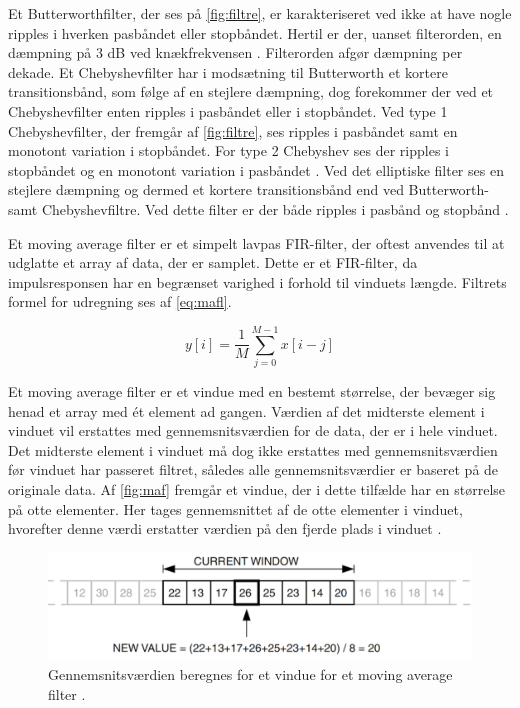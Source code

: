 \noindent
Et Butterworthfilter, der ses på \autoref{fig:filtre}, er karakteriseret ved ikke at have nogle ripples i hverken pasbåndet eller stopbåndet. 
Hertil er der, uanset filterorden, en dæmpning på 3 dB ved knækfrekvensen \citep{nilsson2015}. Filterorden afgør dæmpning per dekade.
Et Chebyshevfilter har i modsætning til Butterworth et kortere transitionsbånd, som følge af en stejlere dæmpning, dog forekommer der ved et Chebyshevfilter enten ripples i pasbåndet eller i stopbåndet. 
Ved type 1 Chebyshevfilter, der fremgår af \autoref{fig:filtre}, ses ripples i pasbåndet samt en monotont variation i stopbåndet. 
For type 2 Chebyshev ses der ripples i stopbåndet og en monotont variation i pasbåndet \citep{nilsson2015}. 
Ved det elliptiske filter ses en stejlere dæmpning og dermed et kortere transitionsbånd end ved Butterworth- samt Chebyshevfiltre. 
Ved dette filter er der både ripples i pasbånd og stopbånd \citep{nilsson2015}. 

\vspace{3mm}
\noindent
Et moving average filter er et simpelt lavpas FIR-filter, der oftest anvendes til at udglatte et array af data, der er samplet. 
Dette er et FIR-filter, da impulsresponsen har en begrænset varighed i forhold til vinduets længde. 
Filtrets formel for udregning ses af \autoref{eq:mafl}.

\begin{equation}
	y[i]=\dfrac{1}{M}\sum^{M-1}_{j=0} x[i-j]
\label{eq:mafl}
\end{equation}

\noindent 
Et moving average filter er et vindue med en bestemt størrelse, der bevæger sig henad et array med ét element ad gangen. 
Værdien af det midterste element i vinduet vil erstattes med gennemsnitsværdien for de data, der er i hele vinduet. 
Det midterste element i vinduet må dog ikke erstattes med gennemsnitsværdien før vinduet har passeret filtret, således alle gennemsnitsværdier er baseret på de originale data. 
Af \autoref{fig:maf} fremgår et vindue, der i dette tilfælde har en størrelse på otte elementer. 
Her tages gennemsnittet af de otte elementer i vinduet, hvorefter denne værdi erstatter værdien på den fjerde plads i vinduet \citep{atmel2002}.

\begin{figure} [H]
\centering
\includegraphics[width=1\textwidth]{figures/maf}
\caption{Gennemsnitsværdien beregnes for et vindue for et moving average filter \citep{atmel2002}.}
\label{fig:maf}
\end{figure} 


